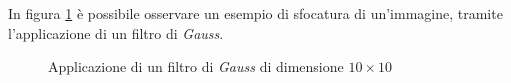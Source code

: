 In figura \ref{fig:gauss-filter} \`e possibile osservare un esempio di sfocatura di un'immagine, tramite l'applicazione di un filtro di \textit{Gauss}.
\begin{figure}[H]
	\centering
	\caption{Applicazione di un filtro di \textit{Gauss} di dimensione $10\times10$} \label{fig:gauss-filter}
\end{figure}


